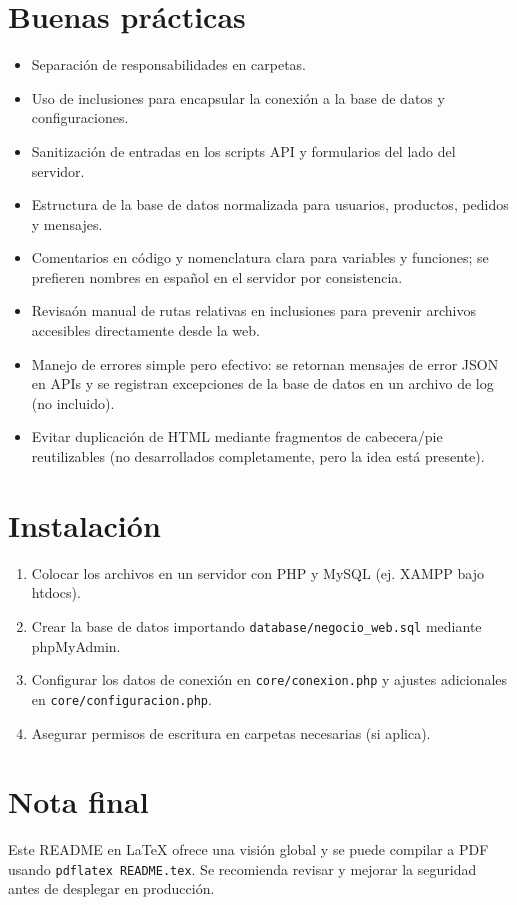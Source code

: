 \documentclass[a4paper,12pt]{article}
\begin{document}
\section{Buenas pr\'acticas}
\begin{itemize}
  \item Separaci\'on de responsabilidades en carpetas.
  \item Uso de inclusiones para encapsular la conexi\'on a la base de datos y configuraciones.
  \item Sanitizaci\'on de entradas en los scripts API y formularios del lado del servidor.
  \item Estructura de la base de datos normalizada para usuarios, productos, pedidos y mensajes.
  \item Comentarios en c\'odigo y nomenclatura clara para variables y funciones; se prefieren nombres en espa\~nol en el servidor por consistencia.
  \item Revisa\'on manual de rutas relativas en inclusiones para prevenir archivos accesibles directamente desde la web.
  \item Manejo de errores simple pero efectivo: se retornan mensajes de error JSON en APIs y se registran excepciones de la base de datos en un archivo de log (no incluido).
  \item Evitar duplicaci\'on de HTML mediante fragmentos de cabecera/pie reutilizables (no desarrollados completamente, pero la idea est\'a presente).
\end{itemize}

\section{Instalaci\'on}
\begin{enumerate}
  \item Colocar los archivos en un servidor con PHP y MySQL (ej. XAMPP bajo \\htdocs).
  \item Crear la base de datos importando \texttt{database/negocio\_web.sql} mediante phpMyAdmin.
  \item Configurar los datos de conexi\'on en \texttt{core/conexion.php} y ajustes adicionales en \texttt{core/configuracion.php}.
  \item Asegurar permisos de escritura en carpetas necesarias (si aplica).
\end{enumerate}

\section{Nota final}
Este README en LaTeX ofrece una visi\'on global y se puede compilar a PDF usando \texttt{pdflatex README.tex}.
Se recomienda revisar y mejorar la seguridad antes de desplegar en producci\'on.
\end{document}
